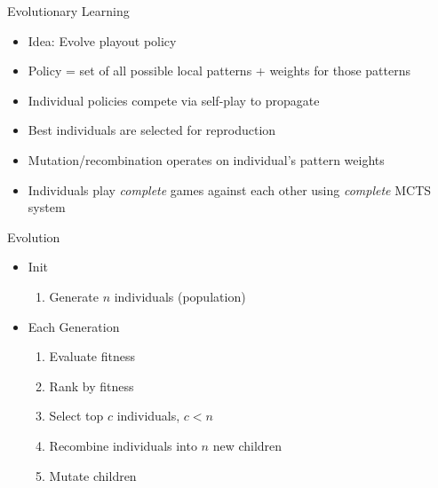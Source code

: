 \documentclass{beamer}
\begin{document}
\begin{frame}{Evolutionary Learning}
\begin{itemize}
	\item Idea: Evolve playout policy
	\item Policy = set of all possible local patterns + weights for those patterns
	\item Individual policies compete via self-play to propagate
	\item Best individuals are selected for reproduction
	\item Mutation/recombination operates on individual's pattern weights
	\item Individuals play \emph{complete} games against each other using \emph{complete} MCTS system
\end{itemize}
\end{frame}

\begin{frame}{Evolution}
\begin{itemize}
	\item Init
	\begin{enumerate}
		\item Generate $n$ individuals (population)
	\end{enumerate}
	\item Each Generation
	\begin{enumerate}
		\item Evaluate fitness
		\item Rank by fitness
		\item Select top $c$ individuals, $c < n$
		\item Recombine individuals into $n$ new children
		\item Mutate children
	\end{enumerate}
\end{itemize}
\end{frame}
\end{document}
